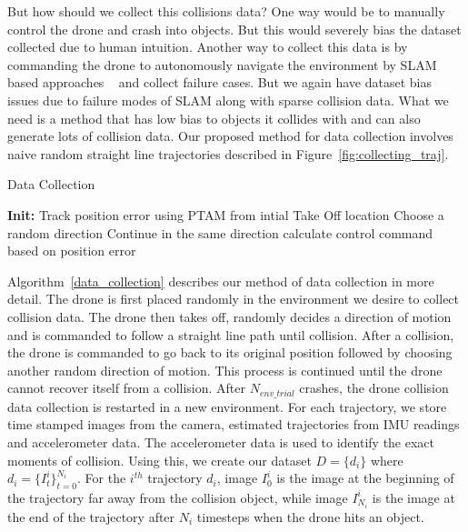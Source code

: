 \documentclass[letterpaper, 10 pt, conference]{ieeeconf}  %
\begin{document}
But how should we collect this collisions data? One way would be to manually control the drone and crash into objects. But this would severely bias the dataset collected due to human intuition. Another way to collect this data is by commanding the drone to autonomously navigate the environment by SLAM based approaches ~\cite{montemerlo2002fastslam,thrun2004simultaneous} and collect failure cases. But we again have dataset bias issues due to failure modes of SLAM along with sparse collision data. What we need is a method that has low bias to objects it collides with and can also generate lots of collision data. Our proposed method for data collection involves naive random straight line trajectories described in Figure~\ref{fig:collecting_traj}. 

\begin{algorithm}
\caption{Data Collection}\label{data_collection}
\begin{algorithmic}[1]
\State \textbf{Init:} Track position error using PTAM from intial Take Off location
    \State Choose a random direction
        \State Continue in the same direction
    \EndWhile
        \State calculate control command based on position error
    \EndWhile
\EndWhile

\end{algorithmic}
\end{algorithm}

Algorithm~\ref{data_collection} describes our method of data collection in more detail. The drone is first placed randomly in the environment we desire to collect collision data. The drone then takes off, randomly decides a direction of motion and is commanded to follow a straight line path until collision. After a collision, the drone is commanded to go back to its original position followed by choosing another random direction of motion. This process is continued until the drone cannot recover itself from a collision. After $N_{env\_trial}$ crashes, the drone collision data collection is restarted in a new environment. For each trajectory, we store time stamped images from the camera, estimated trajectories from IMU readings and accelerometer data. The accelerometer data is used to identify the exact moments of collision. Using this, we create our dataset $D=\{d_i\}$ where $d_i=\{I^i_t\}^{N_i}_{t=0}$. For the $i^{th}$ trajectory $d_i$, image $I^i_0$ is the image at the beginning of the trajectory far away from the collision object, while image $I^i_{N_i}$ is the image at the end of the trajectory after $N_i$ timesteps when the drone hits an object.
\end{document}
